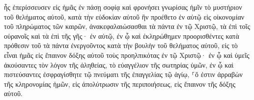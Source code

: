 \documentclass{openreader}
\begin{document}
ἧς ἐπερίσσευσεν εἰς ἡμᾶς ἐν πάσῃ σοφίᾳ καὶ φρονήσει 
γνωρίσας ἡμῖν τὸ μυστήριον τοῦ θελήματος αὐτοῦ, κατὰ τὴν εὐδοκίαν αὐτοῦ ἣν προέθετο ἐν αὐτῷ 
εἰς οἰκονομίαν τοῦ πληρώματος τῶν καιρῶν, ἀνακεφαλαιώσασθαι τὰ πάντα ἐν τῷ Χριστῷ, τὰ ἐπὶ τοῖς οὐρανοῖς καὶ τὰ ἐπὶ τῆς γῆς· ἐν αὐτῷ, 
ἐν ᾧ καὶ ἐκληρώθημεν προορισθέντες κατὰ πρόθεσιν τοῦ τὰ πάντα ἐνεργοῦντος κατὰ τὴν βουλὴν τοῦ θελήματος αὐτοῦ, 
εἰς τὸ εἶναι ἡμᾶς εἰς ἔπαινον δόξης αὐτοῦ τοὺς προηλπικότας ἐν τῷ Χριστῷ· 
ἐν ᾧ καὶ ὑμεῖς ἀκούσαντες τὸν λόγον τῆς ἀληθείας, τὸ εὐαγγέλιον τῆς σωτηρίας ὑμῶν, ἐν ᾧ καὶ πιστεύσαντες ἐσφραγίσθητε τῷ πνεύματι τῆς ἐπαγγελίας τῷ ἁγίῳ, 
⸀ὅ ἐστιν ἀρραβὼν τῆς κληρονομίας ἡμῶν, εἰς ἀπολύτρωσιν τῆς περιποιήσεως, εἰς ἔπαινον τῆς δόξης αὐτοῦ. 
\end{document}
